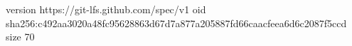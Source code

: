 version https://git-lfs.github.com/spec/v1
oid sha256:c492aa3020a48fc95628863d67d7a877a205887fd66caacfeea6d6c2087f5ccd
size 70
